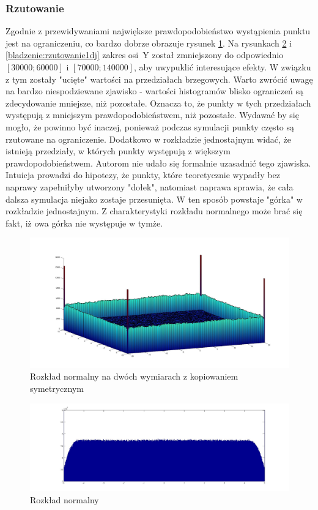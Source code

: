 \documentclass{mini}
\begin{document}
\subsubsection*{Rzutowanie}
Zgodnie z przewidywaniami największe prawdopodobieństwo wystąpienia punktu jest na ograniczeniu, co bardzo dobrze obrazuje rysunek \ref{bladzenie:rzutowanie2d}. Na rysunkach   \ref{bladzenie:rzutowanie1dn} i  \ref{bladzenie:rzutowanie1dj} zakres osi~Y został zmniejszony do odpowiednio $[30000;60000]$ i $[70000;140000]$, aby uwypuklić interesujące efekty. W związku z tym zostały "ucięte" wartości na przedziałach brzegowych. Warto zwrócić uwagę na bardzo niespodziewane zjawisko - wartości histogramów blisko ograniczeń są zdecydowanie mniejsze, niż pozostałe. Oznacza to, że punkty w tych przedziałach występują z mniejszym prawdopodobieństwem, niż pozostałe. Wydawać by się mogło, że powinno być inaczej, ponieważ podczas symulacji punkty często są rzutowane na ograniczenie. Dodatkowo w rozkładzie jednostajnym widać, że istnieją przedziały, w których punkty występują z większym prawdopodobieństwem. Autorom nie udało się formalnie uzasadnić tego zjawiska. Intuicja prowadzi do hipotezy, że punkty, które teoretycznie wypadły bez naprawy zapełniłyby utworzony "dołek", natomiast naprawa sprawia, że cała dalsza symulacja niejako zostaje przesunięta. W ten sposób powstaje "górka" w rozkładzie jednostajnym. Z charakterystyki rozkładu normalnego może brać się fakt, iż owa górka nie występuje w tymże.

\begin{figure}[H]
\centering
\includegraphics[width=\textwidth]{p_n_10M_2__20_20__10_10_4_2}
\caption{Rozkład normalny na dwóch wymiarach z kopiowaniem symetrycznym}
\label{bladzenie:rzutowanie2d}
\end{figure}

\begin{figure}[H]
\centering
\includegraphics[width=\textwidth]{p_n_50M_1__5_5}
\caption{Rozkład normalny}
\label{bladzenie:rzutowanie1dn}
\end{figure}
\end{document}
